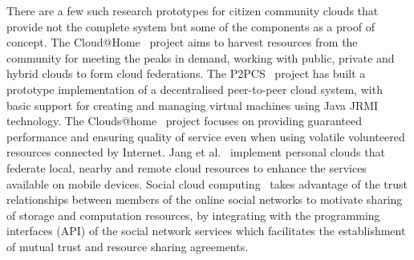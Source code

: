 There are a few such research prototypes for citizen community clouds that provide not the complete system but some of the components as a proof of concept.
The Cloud@Home~\cite{Distefano2012} project aims to harvest resources from the community for meeting the peaks in demand, working with public, private and hybrid clouds to form cloud federations.
The P2PCS~\cite{Babaoglu2012} project has built a prototype implementation of a decentralised peer-to-peer cloud system,
with basic support for creating and managing virtual machines using Java JRMI technology.
The Clouds@home~\cite{Yi2011} project focuses on providing guaranteed performance and ensuring quality of service even when using volatile volunteered resources connected by Internet.
Jang et al.~\cite{Jang2014} implement personal clouds that federate local, nearby and remote cloud resources to enhance the services available on mobile devices.
%
Social cloud computing~\cite{Chard2012, Caton2014} takes advantage of the trust relationships between members of the online social networks to motivate sharing of storage and computation resources,
by integrating with the programming interfaces (API) of the social network services which facilitates the establishment of mutual trust and resource sharing agreements.
